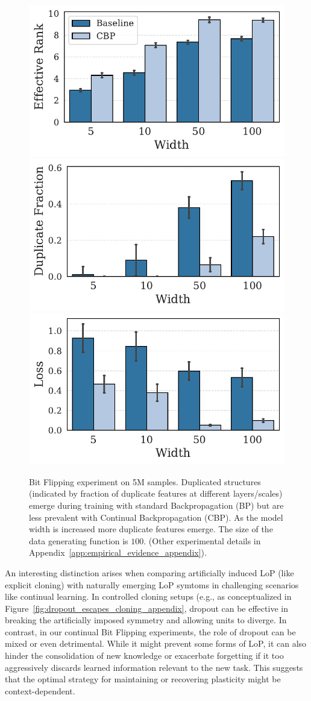 \documentclass{article}
\numberwithin{figure}{section}
\begin{document}
\begin{figure}[!ht]
    \centering
    \includegraphics[width=0.23\linewidth]{paper/images/bf_Effective Rank_CBP_barplot.pdf}
    \includegraphics[width=0.23\linewidth]{paper/images/bf_Duplicate Fraction_CBP_barplot.pdf}
    \includegraphics[width=0.23\linewidth]{paper/images/bf_Loss_CBP_barplot.pdf}
    \vspace{-.3cm}
    \caption{Bit Flipping experiment on 5M samples. Duplicated structures (indicated by fraction of duplicate features at different layers/scales) emerge during training with standard Backpropagation (BP) but are less prevalent with Continual Backpropagation (CBP). As the model width is increased more duplicate features emerge. The size of the data generating function is $100$. (Other experimental details in Appendix~\ref{app:empirical_evidence_appendix}).}
    \label{fig:CBP-scale-dup}
\end{figure}
% 

An interesting distinction arises when comparing artificially induced LoP (like explicit cloning) with naturally emerging LoP symtoms in challenging scenarios like continual learning. In controlled cloning setups (e.g., as conceptualized in Figure~\ref{fig:dropout_escapes_cloning_appendix}, dropout can be effective in breaking the artificially imposed symmetry and allowing units to diverge. In contrast, in our continual Bit Flipping experiments, the role of dropout can be mixed or even detrimental. While it might prevent some forms of LoP, it can also hinder the consolidation of new knowledge or exacerbate forgetting if it too aggressively discards learned information relevant to the new task. This suggests that the optimal strategy for maintaining or recovering plasticity might be context-dependent.
\end{document}
